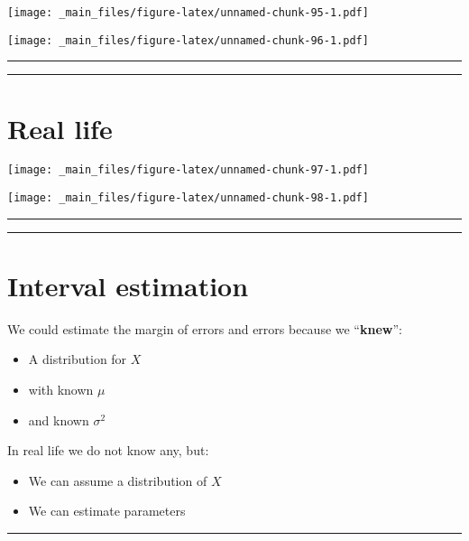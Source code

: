 \documentclass[
]{book}
\providecommand{\tightlist}{%
  \setlength{\itemsep}{0pt}\setlength{\parskip}{0pt}}
\begin{document}
\texttt{[image: \_main\_files/figure-latex/unnamed-chunk-95-1.pdf]}

\texttt{[image: \_main\_files/figure-latex/unnamed-chunk-96-1.pdf]}

\begin{center}\rule{0.5\linewidth}{0.5pt}\end{center}

\begin{center}\rule{0.5\linewidth}{0.5pt}\end{center}

\hypertarget{real-life}{%
\section{Real life}\label{real-life}}

\texttt{[image: \_main\_files/figure-latex/unnamed-chunk-97-1.pdf]}

\texttt{[image: \_main\_files/figure-latex/unnamed-chunk-98-1.pdf]}

\begin{center}\rule{0.5\linewidth}{0.5pt}\end{center}

\begin{center}\rule{0.5\linewidth}{0.5pt}\end{center}

\hypertarget{interval-estimation-1}{%
\section{Interval estimation}\label{interval-estimation-1}}

We could estimate the margin of errors and errors because we ``\textbf{knew}'':

\begin{itemize}
\tightlist
\item
  A distribution for \(X\)
\item
  with known \(\mu\)
\item
  and known \(\sigma^2\)
\end{itemize}

In real life we do not know any, but:

\begin{itemize}
\tightlist
\item
  We can assume a distribution of \(X\)
\item
  We can estimate parameters
\end{itemize}

\begin{center}\rule{0.5\linewidth}{0.5pt}\end{center}
\end{document}
